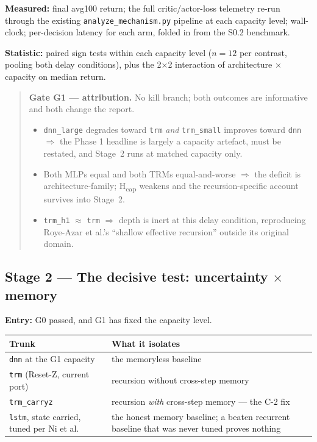 \documentclass[11pt]{article}
\newcommand{\code}[1]{\texttt{\small #1}}
\newcommand{\gate}[1]{\textcolor{gateamber}{\textbf{#1}}}
\begin{document}
\textbf{Measured:} final avg100 return; the full critic/actor-loss telemetry re-run through the existing \code{analyze\_mechanism.py} pipeline at each capacity level; wall-clock; per-decision latency for each arm, folded in from the S0.2 benchmark.

\textbf{Statistic:} paired sign tests within each capacity level ($n = 12$ per contrast, pooling both delay conditions), plus the 2$\times$2 interaction of architecture $\times$ capacity on median return.

\begin{quote}
\gate{Gate G1 --- attribution.} No kill branch; both outcomes are informative and both change the report.
\begin{itemize}[leftmargin=1.2em,itemsep=1pt,topsep=3pt]
\item \code{dnn\_large} degrades toward \code{trm} \emph{and} \code{trm\_small} improves toward \code{dnn} $\Rightarrow$ the Phase 1 headline is largely a capacity artefact, must be restated, and Stage~2 runs at matched capacity only.
\item Both MLPs equal and both TRMs equal-and-worse $\Rightarrow$ the deficit is architecture-family; H\textsubscript{cap} weakens and the recursion-specific account survives into Stage~2.
\item \code{trm\_h1} $\approx$ \code{trm} $\Rightarrow$ depth is inert at this delay condition, reproducing Roye-Azar et al.'s ``shallow effective recursion'' outside its original domain.
\end{itemize}
\end{quote}

\subsection{Stage 2 --- The decisive test: uncertainty $\times$ memory}

\textbf{Entry:} G0 passed, and G1 has fixed the capacity level.

\begin{center}\small
\begin{tabular}{@{}lp{}@{}}
\toprule
\textbf{Trunk} & \textbf{What it isolates} \\
\midrule
\code{dnn} at the G1 capacity & the memoryless baseline \\
\code{trm} (Reset-Z, current port) & recursion without cross-step memory \\
\code{trm\_carryz} & recursion \emph{with} cross-step memory --- the C-2 fix \\
\code{lstm}, state carried, tuned per Ni et al. & the honest memory baseline; a beaten recurrent baseline that was never tuned proves nothing \\
\bottomrule
\end{tabular}
\end{center}
\end{document}
